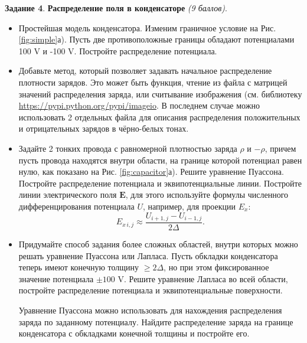 \documentclass[12pt]{article}
\newcommand{\task}[2]{\vspace{6pt}
\textbf{Задание #1}. #2 \vspace{6pt}}
\begin{document}
\task{4}{\textbf{Распределение поля в конденсаторе} \textit{(9 баллов)}. 
\begin{itemize}
\item Простейшая модель конденсатора. Изменим граничное условие на Рис. \ref{fig:simple}а). Пусть две противоположные границы обладают потенциалами 100 V и -100 V. Постройте распределение потенциала.

\item Добавьте метод, который позволяет задавать начальное распределение плотности зарядов. Это может быть функция, чтение из файла с матрицей значений распределения заряда, или считывание изображения (см. библиотеку \url{https://pypi.python.org/pypi/imageio}. В последнем случае можно использовать 2 отдельных файла для описания распределения положительных и отрицательных зарядов в чёрно-белых тонах.

\item Задайте 2 тонких провода с равномерной плотностью заряда $\rho$ и $-\rho$, причем пусть провода находятся внутри области, на границе которой потенциал равен нулю, как показано на Рис. \ref{fig:capacitor}а). Решите уравнение Пуассона. Постройте распределение потенциала и эквипотенциальные линии. Постройте линии электрического поля $\mathbf{E}$, для этого используйте формулы численного дифференцирования потенциала $U$, например, для проекции $E_x$:
%
\begin{equation}
E_{x\,i,j} \approx \frac{U_{i+1,j}-U_{i-1,j}}{2\Delta}.
\end{equation}

\item Придумайте способ задания более сложных областей, внутри которых можно решать уравнение Пуассона или Лапласа. Пусть обкладки конденсатора теперь имеют конечную толщину $\geq 2\Delta$, но при этом фиксированное значение потенциала $\pm 100$ V. Решите уравнение Лапласа во всей области, постройте распределение потенциала и эквипотенциальные поверхности.

Уравнение Пуассона можно использовать для нахождения распределения заряда по заданному потенциалу. Найдите распределение заряда на границе конденсатора с обкладками конечной толщины и постройте его.
\end{itemize}

}
\end{document}
